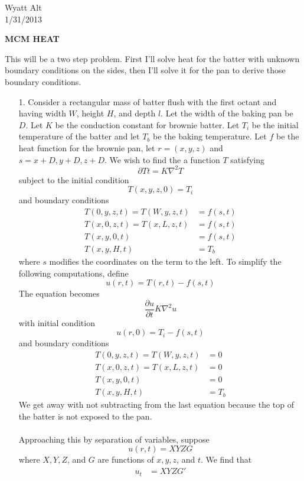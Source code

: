 \documentclass[11pt, fullpage]{article}
\begin{document}
\begin{flushright}
Wyatt Alt\\
1/31/2013\\
\end{flushright}
\begin{flushleft}
\textbf{MCM HEAT}\\
\end{flushleft}
This will be a two step problem.  First I'll solve heat for the batter with unknown boundary conditions on the sides, then I'll solve it for the pan to derive those boundary conditions.
\begin{enumerate}
\item[1.] Consider a rectangular mass of batter flush with the first octant and having width $W$, height $H$, and depth $l$.  Let the width of the baking pan be $D$.  Let $K$ be the conduction constant for brownie batter.  Let $T_i$ be the initial temperature of the batter and let $T_b$ be the baking temperature.  Let $f$ be the heat function for the brownie pan, let $r = (x,y,z)$ and $s = x+D,y+D,z+D$.   We wish to find the a function $T$ satisfying
\[\partial{T}{t} = K \nabla^2 T\]
subject to the initial condition
\[T(x,y,z,0) = T_i\]
and boundary conditions \begin{align*}
T(0,y,z,t) = T(W,y,z,t) &= f(s,t)\\
T(x,0,z,t) = T(x,L,z,t) &= f(s,t)\\
T(x,y,0,t) &= f(s,t)\\
T(x,y,H,t) &= T_b \end{align*}
where $s$ modifies the coordinates on the term to the left.
To simplify the following computations, define
\[u(r,t) = T(r,t) - f(s,t)\]
The equation becomes 
\[\frac{\partial u}{\partial t} K \nabla^2 u\]
with initial condition
\[u(r,0) = T_i - f(s,t)\]
and boundary conditions \begin{align*}
T(0,y,z,t) = T(W,y,z,t) &= 0\\
T(x,0,z,t) = T(x,L,z,t) &= 0\\
T(x,y,0,t) &= 0\\
T(x,y,H,t) &= T_b\end{align*}
We get away with not subtracting from the last equation because the top of the batter is not exposed to the pan.\\
\\
Approaching this by separation of variables, suppose
\[u(r,t) = XYZG\]
where $X,Y,Z$, and $G$ are functions of $x,y,z$, and $t$.  We find that \begin{align*}
u_t &= XYZG'\\

\end{align*}
\end{enumerate}
\end{document}
